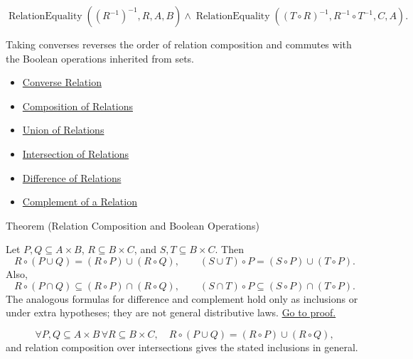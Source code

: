 \begin{remark*}
\[
  \operatorname{RelationEquality}((R^{-1})^{-1},R,A,B)
  \wedge
  \operatorname{RelationEquality}((T\circ R)^{-1},R^{-1}\circ T^{-1},C,A).
\]
\end{remark*}

\begin{remark*}[Interpretation]
Taking converses reverses the order of relation composition and commutes with
the Boolean operations inherited from sets.
\end{remark*}

\begin{dependencies}
\begin{itemize}
  \item \hyperref[def:converse-relation]{Converse Relation}
  \item \hyperref[def:relation-composition]{Composition of Relations}
  \item \hyperref[def:relation-union]{Union of Relations}
  \item \hyperref[def:relation-intersection]{Intersection of Relations}
  \item \hyperref[def:relation-difference]{Difference of Relations}
  \item \hyperref[def:relation-complement]{Complement of a Relation}
\end{itemize}
\end{dependencies}

\begin{theorembox}{Theorem (Relation Composition and Boolean Operations)}
\begin{theorem}\label{thm:relation-composition-boolean}
Let $P,Q\subseteq A\times B$, $R\subseteq B\times C$, and
$S,T\subseteq B\times C$. Then
\[
R\circ(P\cup Q)=(R\circ P)\cup(R\circ Q),
\qquad
(S\cup T)\circ P=(S\circ P)\cup(T\circ P).
\]
Also,
\[
R\circ(P\cap Q)\subseteq(R\circ P)\cap(R\circ Q),
\qquad
(S\cap T)\circ P\subseteq(S\circ P)\cap(T\circ P).
\]
The analogous formulas for difference and complement hold only as inclusions
or under extra hypotheses; they are not general distributive laws.
\hyperref[prf:relation-composition-boolean]{Go to proof.}
\end{theorem}
\end{theorembox}

\begin{remark*}
\[
  \forall P,Q\subseteq A\times B\,\forall R\subseteq B\times C,\quad
  R\circ(P\cup Q)=(R\circ P)\cup(R\circ Q),
\]
and relation composition over intersections gives the stated inclusions in
general.
\end{remark*}


